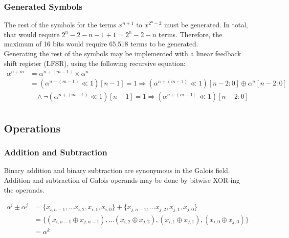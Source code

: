 \documentclass[paper=usletter, fontsize=12pt]{article}
\begin{document}
            \subsubsection{Generated Symbols}
            The rest of the symbols for the terms $x^{n+1}$ to $x^{2^{n}-2}$ must be generated. In total, that would require $2^{n}-2-n-1+1=2^{n}-2-n$ terms. Therefore, the maximum of 16 bits would require 65,518 terms to be generated. \\
            Generating the rest of the symbols may be implemented with a linear feedback shift register (LFSR), using the following recursive equation: \\

                \begin{equation*}
                    \begin{split}
                        \alpha^{n+m} & =\alpha^{n+(m-1)}\times \alpha^{n} \\
                        & = (\alpha^{n+(m-1)} \ll 1 )[n-1] = 1 \Longrightarrow ( \alpha^{n+(m-1)} \ll 1 )[n-2:0] \oplus \alpha^{n}[n-2:0] \\
                        & \ \ \ \ \wedge \neg (\alpha^{n+(m-1)} \ll 1 )[n-1] = 1 \Longrightarrow ( \alpha^{n+(m-1)} \ll 1 )[n-2:0] \\
                    \end{split}
                \end{equation*}

            \newpage

        \subsection{Operations}

            \subsubsection{Addition and Subtraction}
            Binary addition and binary subtraction are synonymous in the Galois field. Addition and subtraction of Galois operands may be done by bitwise XOR-ing the operands.

                \begin{equation*}
                    \begin{split}
                        \alpha^{i} \pm \alpha^{j} & = \{x_{i, n-1},\ldots x_{i, 2},x_{i, 1},x_{i, 0}\} + \{x_{j, n-1}, \ldots x_{j, 2}, x_{j, 1}, x_{j, 0}\} \\
                        & = \{(x_{i, n-1} \oplus x_{j,n-1}), \ldots (x_{i, 2}\oplus x_{j, 2}), (x_{i, 1}\oplus x_{j, 1}), (x_{i, 0}\oplus x_{j, 0})\} \\
                        & = \alpha^{k}
                    \end{split}
                \end{equation*}
\end{document}
